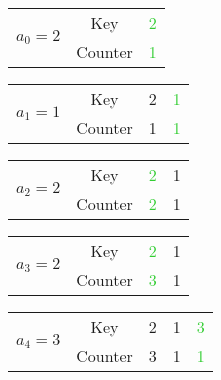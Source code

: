 \documentclass{article}
\newcommand{\MGinc}[1]{\textcolor{LimeGreen}{#1}}
\begin{document}
  \begin{center}
    \begin{minipage}{0.45\textwidth}
      \begin{center}
        \begin{tabular}{c|c|c|}
          \cline{2-3}
          \multirow{2}{*}{\textbf{\LARGE{$a_0=2$}}}
          & Key & \MGinc{2} \\\cline{2-3}
          & Counter & \MGinc{1} \\
          \cline{2-3}
        \end{tabular}\vspace{3mm}

        \begin{tabular}{c|c|c|c|}
          \cline{2-4}
          \multirow{2}{*}{\textbf{\LARGE{$a_1=1$}}}
          & Key & 2 & \MGinc{1} \\\cline{2-4}
          & Counter & 1 & \MGinc{1} \\
          \cline{2-4}
        \end{tabular}\vspace{3mm}

        \begin{tabular}{c|c|c|c|}
          \cline{2-4}
          \multirow{2}{*}{\textbf{\LARGE{$a_2=2$}}}
          & Key & \MGinc{2} & 1 \\\cline{2-4}
          & Counter & \MGinc{2} & 1 \\
          \cline{2-4}
        \end{tabular}\vspace{3mm}

        \begin{tabular}{c|c|c|c|}
          \cline{2-4}
          \multirow{2}{*}{\textbf{\LARGE{$a_3=2$}}}
          & Key & \MGinc{2} & 1 \\\cline{2-4}
          & Counter & \MGinc{3} & 1 \\
          \cline{2-4}
        \end{tabular}\vspace{3mm}

        \begin{tabular}{c|c|c|c|c|}
          \cline{2-5}
          \multirow{2}{*}{\textbf{\LARGE{$a_4=3$}}}
          & Key & 2 & 1 & \MGinc{3} \\\cline{2-5}
          & Counter & 3 & 1 & \MGinc{1} \\
          \cline{2-5}
        \end{tabular}


\end{center}
\end{minipage}
\end{center}
\end{document}
